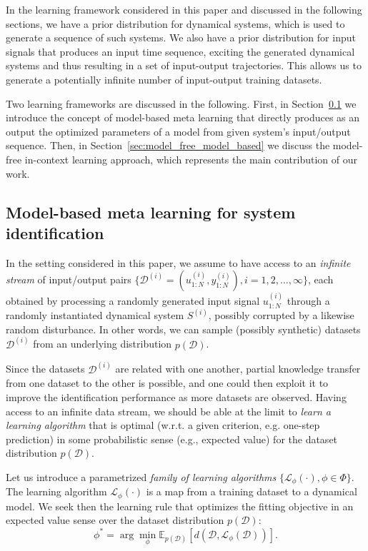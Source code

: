 \documentclass{article}
\newcommand{\sys}{S}
\newcommand{\diss}{d}
\newcommand{\learn}{\mathcal{L}}
\newcommand{\D}{\mathcal{D}}
\newcommand{\E}{\mathbb{E}}
\begin{document}
In the learning framework considered in this paper and discussed in the following sections, we have a prior distribution for dynamical systems, which is used to generate a sequence of such systems. We also have a prior distribution for input signals that produces an input time sequence, exciting the generated dynamical systems and thus resulting in a set of input-output trajectories. This allows us to generate a potentially infinite number of input-output training datasets. 

Two learning frameworks are discussed in the following. First, in Section~\ref{sec:model_based} we introduce the concept of model-based meta learning that directly produces as an output the optimized parameters of a model from  given system's input/output sequence. Then, in Section~\ref{sec:model_free_model_based} we discuss the model-free in-context learning approach, which represents the main contribution of our work. 

\subsection{Model-based meta learning for system identification} \label{sec:model_based}
In the setting considered in  this 
paper, we assume to have access to an \emph{infinite stream} of input/output pairs $\{\D^{(i)} = (u_{1:N}^{(i)}, y_{1:N}^{(i)}), i=1,2,\dots, \infty \}$, each obtained by processing a randomly generated input signal $u_{1:N}^{(i)}$ through a randomly instantiated dynamical system
$\sys^{(i)}$, possibly corrupted by a likewise random disturbance. In other words, we can sample (possibly synthetic) datasets $\D^{(i)}$ from an underlying  distribution $p(\D)$.

Since the datasets $\D^{(i)}$ are related with one another,
partial knowledge transfer from one dataset to the other is possible, and one could then exploit it to  improve the identification performance as more datasets are 
observed. Having access
to an infinite data stream, we should be able at the limit to \emph{learn a learning algorithm} that
is optimal (w.r.t. a given criterion, e.g. one-step prediction)  in some probabilistic sense (e.g., expected value) for the dataset distribution $p(\D)$.



Let us introduce a parametrized \emph{family of 
learning algorithms} $\{\learn_\phi(\cdot), \phi \in \Phi\}$. The learning algorithm $\learn_{\phi}(\cdot)$ is a map 
from a training dataset to a dynamical model.   
%
We seek then the learning rule that optimizes the fitting objective in an expected value sense over the dataset distribution $p(\D)$:
\begin{equation}
	\label{eq:meta_objective_exp_noval}
    \phi^{*} = \arg \min_\phi \E_{p(\D)} \left [\diss\left ( \D, \learn_\phi(\D) \right ) \right ].
\end{equation}
\end{document}
